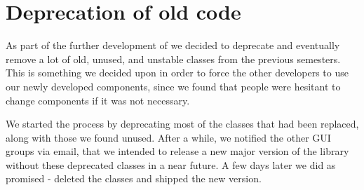 
\section{Deprecation of old code}
\label{sec:deprecation_of_old_code}

As part of the further development of \gc we decided to deprecate and eventually remove a lot of old, unused, and unstable classes from the previous semesters. This is something we decided upon in order to force the other developers to use our newly developed components, since we found that people were hesitant to change components if it was not necessary.

We started the process by deprecating most of the classes that had been replaced, along with those we found unused. After a while, we notified the other GUI groups via email, that we intended to release a new major version of the \gc library without these deprecated classes in a near future. A few days later we did as promised - deleted the classes and shipped the new version. 
